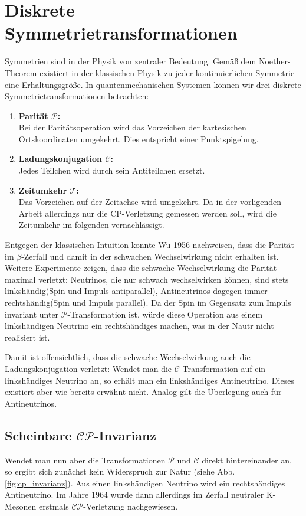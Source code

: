 \section{Diskrete Symmetrietransformationen}
Symmetrien sind in der Physik von zentraler Bedeutung. Gemäß dem Noether-Theorem existiert in der klassischen Physik zu jeder kontinuierlichen Symmetrie eine Erhaltungsgröße. In quantenmechanischen Systemen können wir drei diskrete Symmetrietransformationen betrachten:
\begin{enumerate}
\item \textbf{Parität $\mathcal{P}$:} \\
      Bei der Paritätsoperation wird das Vorzeichen der kartesischen Ortskoordinaten umgekehrt. Dies entspricht einer Punktspigelung.
\item \textbf{Ladungskonjugation $\mathcal{C}$:} \\
      Jedes Teilchen wird durch sein Antiteilchen ersetzt.
\item \textbf{Zeitumkehr $\mathcal{T}$:} \\
      Das Vorzeichen auf der Zeitachse wird umgekehrt. Da in der vorligenden Arbeit allerdings nur die CP-Verletzung gemessen werden soll, wird die Zeitumkehr im folgenden vernachlässigt.
\end{enumerate}
Entgegen der klassischen Intuition konnte Wu 1956 nachweisen, dass die Parität im $\beta$-Zerfall und damit in der schwachen Wechselwirkung nicht erhalten ist. Weitere Experimente zeigen, dass die schwache Wechselwirkung die Parität maximal verletzt: Neutrinos, die nur schwach wechselwirken können, sind stets \glqq linkshändig\grqq (Spin und Impuls antiparallel), Antineutrinos dagegen immer \glqq rechtshändig\grqq (Spin und Impuls parallel). Da der Spin im Gegensatz zum Impuls invariant unter $\mathcal{P}$-Transformation ist, würde diese Operation aus einem linkshändigen Neutrino ein rechtshändiges machen, was in der Nautr nicht realisiert ist.

Damit ist offensichtlich, dass die schwache Wechselwirkung auch die Ladungskonjugation verletzt: Wendet man die $\mathcal{C}$-Transformation auf ein linkshändiges Neutrino an, so erhält man ein linkshändiges Antineutrino. Dieses existiert aber wie bereits erwähnt nicht. Analog gilt die Überlegung auch für Antineutrinos.

\subsection{Scheinbare $\mathcal{CP}$-Invarianz}
Wendet man nun aber die Transformationen $\mathcal{P}$ und $\mathcal{C}$ direkt hintereinander an, so ergibt sich zunächst kein Widerspruch zur Natur (siehe Abb. \ref{fig:cp_invarianz}). Aus einen linkshändigen Neutrino wird ein rechtshändiges Antineutrino. Im Jahre 1964 wurde dann allerdings im Zerfall neutraler K-Mesonen erstmals $\mathcal{CP}$-Verletzung nachgewiesen. \cite{kleinknecht}

